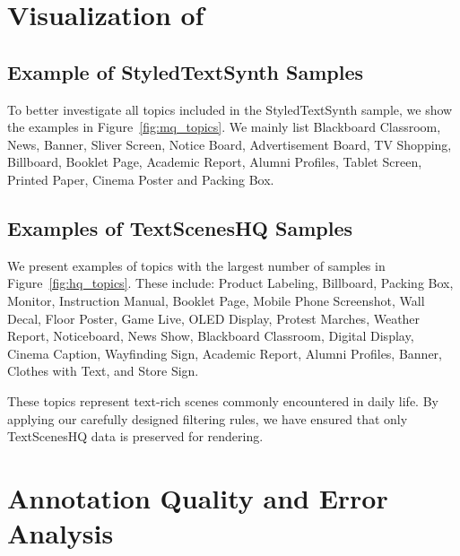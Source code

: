 



\clearpage



\section{Visualization of \DatasetName}


\subsection{Example of StyledTextSynth Samples}
To better investigate all topics included in the StyledTextSynth sample, we show the examples in Figure~\ref{fig:mq_topics}.
We mainly list Blackboard Classroom, News, Banner, Sliver Screen, Notice Board, Advertisement Board, TV Shopping, Billboard, Booklet Page, Academic Report, Alumni Profiles, Tablet Screen, Printed Paper, Cinema Poster and Packing Box.





\subsection{Examples of TextScenesHQ Samples}

We present examples of topics with the largest number of samples in Figure~\ref{fig:hq_topics}. These include:  
Product Labeling, Billboard, Packing Box, Monitor, Instruction Manual, Booklet Page, Mobile Phone Screenshot, Wall Decal, Floor Poster, Game Live, OLED Display, Protest Marches, Weather Report, Noticeboard, News Show, Blackboard Classroom, Digital Display, Cinema Caption, Wayfinding Sign, Academic Report, Alumni Profiles, Banner, Clothes with Text, and Store Sign.

These topics represent text-rich scenes commonly encountered in daily life. 
By applying our carefully designed filtering rules, we have ensured that only TextScenesHQ data is preserved for rendering.











\section{Annotation Quality and Error Analysis}


